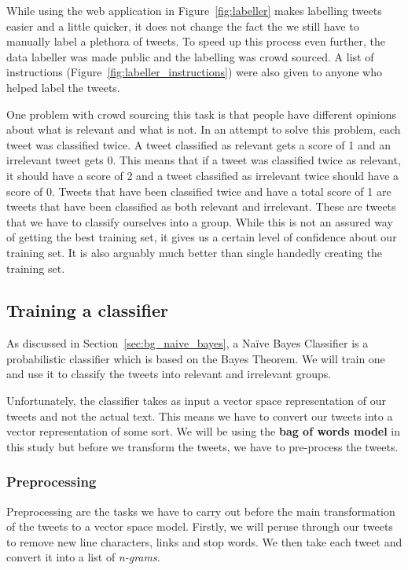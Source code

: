 While using the web application in Figure~\ref{fig:labeller} makes labelling tweets easier and a
little quicker, it does not change the fact the we still have to manually label a plethora of
tweets. To speed up this process even further, the data labeller was made public and the labelling
was crowd sourced. A list of instructions (Figure~\ref{fig:labeller_instructions}) were also given
to anyone who helped label the tweets.

One problem with crowd sourcing this task is that people have different opinions about what is
relevant and what is not. In an attempt to solve this problem, each tweet was classified twice. A
tweet classified as relevant gets a score of 1 and an irrelevant tweet gets 0. This means that if a
tweet was classified twice as relevant, it should have a score of 2 and a tweet classified as
irrelevant twice should have a score of 0. Tweets that have been classified twice and have a total
score of 1 are tweets that have been classified as both relevant and irrelevant. These are tweets
that we have to classify ourselves into a group. While this is not an assured way of getting the
best training set, it gives us a certain level of confidence about our training set. It is also
arguably much better than single handedly creating the training set.

\subsection{Training a classifier}
As discussed in Section~\ref{sec:bg_naive_bayes}, a Na\"{i}ve Bayes Classifier is a probabilistic
classifier which is based on the Bayes Theorem. We will train one and use it to classify the tweets
into relevant and irrelevant groups.

Unfortunately, the classifier takes as input a vector space representation of our tweets and not the
actual text. This means we have to convert our tweets into a vector representation of some sort. We
will be using the \textbf{bag of words model} in this study but before we transform the tweets, we
have to pre-process the tweets.

\subsubsection{Preprocessing}
\label{sec:preprocessing}
Preprocessing are the tasks we have to carry out before the main transformation of the tweets to a
vector space model. Firstly, we will peruse through our tweets to remove new line characters, links
and stop words. We then take each tweet and convert it into a list of \textit{n-grams}.

